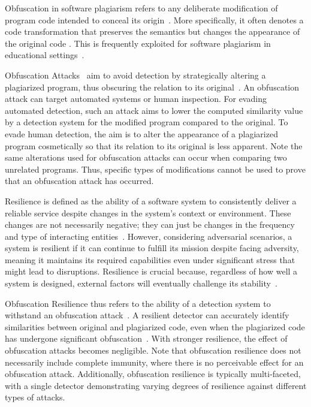\begin{concept}[Obfuscation] Obfuscation in software plagiarism refers to any deliberate modification of program code intended to conceal its origin~\cite{Collberg2002}. 
More specifically, it often denotes a code transformation that preserves the semantics but changes the appearance of the original code \cite{zhang2014}.
This is frequently exploited for software plagiarism in educational settings~\cite{Novak2019}.
\end{concept}

\begin{concept}
Obfuscation Attacks~\cite{Yuan2018, Hayden2019} aim to avoid detection by strategically altering a plagiarized program, thus obscuring the relation to its original~\cite{Saglam2024b, Saglam2024a}. An obfuscation attack can target automated systems or human inspection. For evading automated detection, such an attack aims to lower the computed similarity value by a detection system for the modified program compared to the original.
To evade human detection, the aim is to alter the appearance of a plagiarized program cosmetically so that its relation to its original is less apparent.
Note the same alterations used for obfuscation attacks can occur when comparing two unrelated programs. Thus, specific types of modifications cannot be used to prove that an obfuscation attack has occurred.
\end{concept}

\begin{concept}[Resilience] Resilience is defined as the ability of a software system to consistently deliver a reliable service despite changes in the system's context or environment. These changes are not necessarily negative; they can just be changes in the frequency and type of interacting entities~\cite{Andersson2021}.
However, considering adversarial scenarios, a system is resilient if it can continue to fulfill its mission despite facing adversity, meaning it maintains its required capabilities even under significant stress that might lead to disruptions. Resilience is crucial because, regardless of how well a system is designed, external factors will eventually challenge its stability~\cite{Firesmith2019}.
\end{concept}
%
\begin{concept} Obfuscation Resilience thus refers to the ability of a detection system to withstand an obfuscation attack~\cite{zhang2014, zhang2014b}.
A resilient detector can accurately identify similarities between original and plagiarized code, even when the plagiarized code has undergone significant obfuscation~\cite{Saglam2022}.
With stronger resilience, the effect of obfuscation attacks becomes negligible. Note that obfuscation resilience does not necessarily include complete immunity, where there is no perceivable effect for an obfuscation attack. Additionally, obfuscation resilience is typically multi-faceted, with a single detector demonstrating varying degrees of resilience against different types of attacks.
\end{concept}

